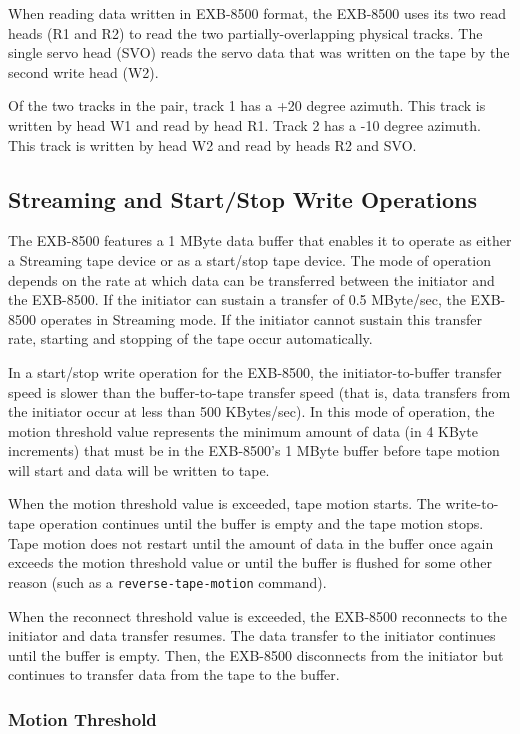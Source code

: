 When reading data written in EXB-8500 format, the EXB-8500 uses its two read
heads (R1 and R2) to read the two partially-overlapping physical tracks. The
single servo head (SVO) reads the servo data that was written on the tape by
the second write head (W2).

Of the two tracks in the pair, track 1 has a +20 degree azimuth. This track
is written by head W1 and read by head R1. Track 2 has a -10 degree azimuth.
This track is written by head W2 and read by heads R2 and SVO.

\subsection {Streaming and Start/Stop Write Operations}

The EXB-8500 features a 1 MByte data buffer that enables it to operate as
either a Streaming tape device or as a start/stop tape device. The mode of
operation depends on the rate at which data can be transferred between the
initiator and the EXB-8500. If the initiator can sustain a transfer of 0.5
MByte/sec, the EXB-8500 operates in Streaming mode. If the initiator cannot
sustain this transfer rate, starting and stopping of the tape occur
automatically.

In a start/stop write operation for the EXB-8500, the initiator-to-buffer
transfer speed is slower than the buffer-to-tape transfer speed (that is,
data transfers from the initiator occur at less than 500 KBytes/sec). In
this mode of operation, the motion threshold value represents the minimum
amount of data (in 4 KByte increments) that must be in the EXB-8500's
1 MByte buffer before tape motion will start and data will be written to
tape.

When the motion threshold value is exceeded, tape motion starts. The
write-to-tape operation continues until the buffer is empty and the tape
motion stops. Tape motion does not restart until the amount of data in the
buffer once again exceeds the motion threshold value or until the buffer is
flushed for some other reason (such as a {\tt reverse-tape-motion} command).

When the reconnect threshold value is exceeded, the EXB-8500 reconnects to
the initiator and data transfer resumes. The data transfer to the initiator
continues until the buffer is empty. Then, the EXB-8500 disconnects from the
initiator but continues to transfer data from the tape to the buffer.

\subsubsection {Motion Threshold}

